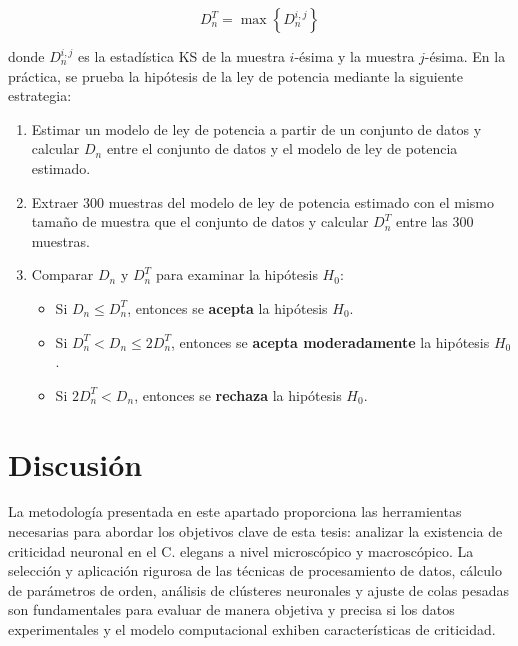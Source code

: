 \begin{equation}\label{eq:98}
	D_n^T = \max\left\{D_n^{i,j}\right\}
\end{equation} 

donde $D_n^{i,j}$ es la estadística \gls{KS} de la muestra $i$-ésima y la muestra $j$-ésima.  En la práctica, se prueba la hipótesis de la ley de potencia mediante la siguiente estrategia:

\begin{procedimiento}\label{procedimiento1}
\phantom{text}
\begin{enumerate}
\item Estimar un modelo de ley de potencia a partir de un conjunto de datos y calcular $D_n$ entre el conjunto de datos y el modelo de ley de potencia estimado.
\item Extraer 300 muestras del modelo de ley de potencia estimado con el mismo tamaño de muestra que el conjunto de datos y calcular $D_n^T$ entre las 300 muestras.
\item Comparar $D_n$ y $D^T_n$ para examinar la hipótesis $H_0$:
\begin{itemize}
\item Si $D_n\leq D^T_n$,  entonces se \textbf{acepta} la hipótesis $H_0$.
\item Si $D^T_n < D_n \leq 2D^T_n$, entonces se \textbf{acepta moderadamente} la hipótesis $H_0$.
\item Si $2D^T_n < D_n$, entonces se \textbf{rechaza} la hipótesis $H_0$.
\end{itemize}
\end{enumerate}
\end{procedimiento}



\section{Discusión}


La metodología presentada en este apartado proporciona las herramientas necesarias para abordar los objetivos clave de esta tesis: analizar la existencia de criticidad neuronal en el C. elegans a nivel microscópico y macroscópico. La selección y aplicación rigurosa de las técnicas de procesamiento de datos, cálculo de parámetros de orden, análisis de clústeres neuronales y ajuste de colas pesadas son fundamentales para evaluar de manera objetiva y precisa si los datos experimentales y el modelo computacional exhiben características de criticidad.

